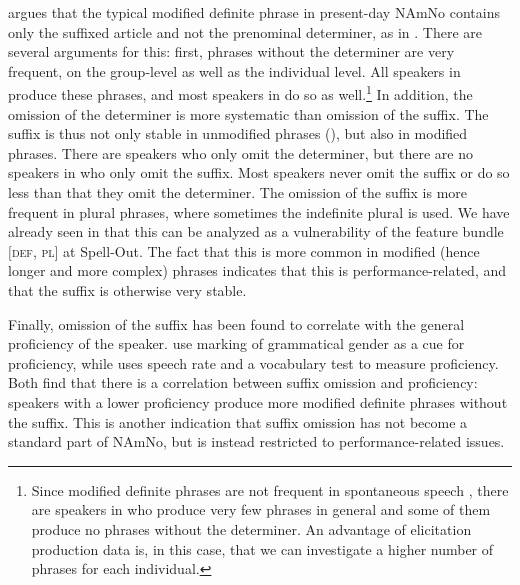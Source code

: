 \documentclass[output=paper]{langscibook}
\begin{document}
{}

 argues that the typical modified definite phrase in present-day NAmNo contains only the suffixed article and not the prenominal determiner, as in . There are several arguments for this: first, phrases without the determiner are very frequent, on the group-level as well as the individual level. All speakers in \citet{vanBaal2020} produce these phrases, and most speakers in \citet{ALW2018} do so as well.\footnote{Since modified definite phrases are not frequent in spontaneous speech \citep[121]{Dahl2015}, there are speakers in \citet{ALW2018} who produce very few phrases in  general and some of them produce no phrases without the determiner. An advantage of elicitation production data is, in this case, that we can investigate a higher number of phrases for each individual.} In addition, the omission of the determiner is more systematic than omission of the suffix. The suffix is thus not only stable in unmodified phrases (), but also in modified phrases. There are speakers who only omit the determiner, but there are no speakers in \citet{vanBaal2020} who only omit the suffix. Most speakers never omit the suffix or do so less than that they omit the determiner. The omission of the suffix is more frequent in plural phrases, where sometimes the indefinite plural is used. We have already seen in  that this can be analyzed as a vulnerability of the feature bundle $[$\textsc{def, pl}$]$ at Spell-Out. The fact that this is more common in modified (hence longer and more complex) phrases indicates that this is performance-related, and that the suffix is otherwise very stable.
 
Finally, omission of the suffix has been found to correlate with the general proficiency of the speaker. \citet{ALW2018} use marking of grammatical gender as a cue for proficiency, while \citet{vanBaal2020} uses speech rate and a vocabulary test to measure proficiency. Both find that there is a correlation between suffix omission and proficiency: speakers with a lower proficiency produce more modified definite phrases without the suffix. This is another indication that suffix omission has not become a standard part of NAmNo, but is instead restricted to performance-related issues.
 
\end{document}
